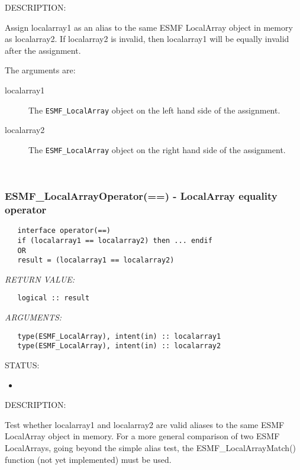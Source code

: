 {\sf DESCRIPTION:\\ }


   Assign localarray1 as an alias to the same ESMF LocalArray object in memory
   as localarray2. If localarray2 is invalid, then localarray1 will be equally invalid after
   the assignment.
  
   The arguments are:
   \begin{description}
   \item[localarray1]
   The {\tt ESMF\_LocalArray} object on the left hand side of the assignment.
   \item[localarray2]
   The {\tt ESMF\_LocalArray} object on the right hand side of the assignment.
   \end{description}
   
 
\mbox{}\hrulefill\ 
 
\subsubsection [ESMF\_LocalArrayOperator(==)] {ESMF\_LocalArrayOperator(==) - LocalArray equality operator}


  
\begin{verbatim}   interface operator(==)
   if (localarray1 == localarray2) then ... endif
   OR
   result = (localarray1 == localarray2)\end{verbatim}{\em RETURN VALUE:}
\begin{verbatim}   logical :: result\end{verbatim}{\em ARGUMENTS:}
\begin{verbatim}   type(ESMF_LocalArray), intent(in) :: localarray1
   type(ESMF_LocalArray), intent(in) :: localarray2\end{verbatim}
{\sf STATUS:}
   \begin{itemize}
   \item{}
   \end{itemize}
  
{\sf DESCRIPTION:\\ }


   Test whether localarray1 and localarray2 are valid aliases to the same ESMF
   LocalArray object in memory. For a more general comparison of two ESMF LocalArrays,
   going beyond the simple alias test, the ESMF\_LocalArrayMatch() function (not yet
   implemented) must be used.
  
